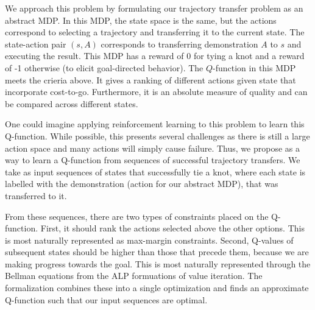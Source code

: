 We approach this problem by formulating our trajectory transfer problem as an abstract MDP. 
In this MDP, 
the state space is the same, but the actions correspond to selecting a trajectory and 
transferring it to the current state. The state-action pair $(s, A)$ corresponds
to transferring demonstration $A$ to $s$ and executing the result. This MDP has a reward 
of 0 for tying a knot and a reward of -1 otherwise (to elicit goal-directed behavior). The 
$Q$-function in this MDP meets the crieria above. It gives a ranking of different actions 
given state that incorporate cost-to-go. Furthermore, it is an absolute measure of quality
and can be compared across different states.

One could imagine applying reinforcement learning to this problem to learn this Q-function.
While possible, this presents several challenges as there is still a large action space
and many actions will simply cause failure. Thus, we propose \mmql{} as a way to learn
a Q-function from sequences of successful trajectory transfers. We take as input 
sequences of states that successfully tie a knot, where each state is labelled with the
demonstration (action for our abstract MDP), that was transferred to it.

From these sequences, there are two types of constraints placed on the Q-function. First, it 
should rank the actions selected above the other options. This is most naturally represented as 
max-margin constraints. Second, Q-values of subsequent states should be higher than those 
that precede them, because we are making progress towards the goal. This is most naturally 
represented through the Bellman equations from the ALP formuations of value iteration. The 
\mmql{} formalization combines these into a single optimization and finds an approximate 
Q-function such that our input sequences are optimal. 






